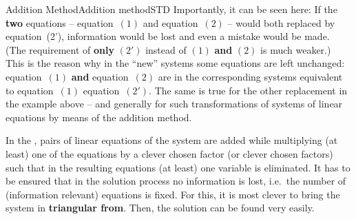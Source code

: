 \begin{MXContent}{Addition Method}{Addition method}{STD}
Importantly, it can be seen here: If the \textbf{two}
equations -- equation~$(1)$ and equation~$(2)$ -- would both replaced by equation~(2'),
information would be lost and even a mistake would be made.
(The requirement of \textbf{only} $(2')$ instead of $(1)$ \textbf{and}
$(2)$ is much weaker.) This is the reason why in the ``new'' systems
some equations are left unchanged: equation~$(1)$ \textbf{and} equation~$(2)$ are
in the corresponding systems equivalent to equation~$(1)$  equation~$(2')$.
The same is true for the other replacement in the example above -- and 
generally for such transformations of systems of linear equations by means 
of the addition method.


\begin{MInfo}
In the , pairs of linear equations of the system 
are added while multiplying (at least) one  of the equations by a clever chosen factor 
(or clever chosen factors) such that in the resulting equations (at least) one variable 
is eliminated. It has to be ensured that in the solution process no information is lost, i.e.\
the number of (information relevant) equations is fixed. For this, it is most clever to bring the 
system in \textbf{triangular from}. Then, the solution can be found very easily.
\end{MInfo}
\end{MXContent}

